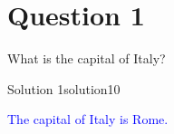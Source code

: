 \documentclass{article}
\begin{document}
\section*{Question 1}
What is the capital of Italy?

\begin{center}
\end{center}

\begin{ocg}{Solution 1}{solution1}{0}
  \begin{center}
    \textcolor{blue}{The capital of Italy is Rome.}
  \end{center}
\end{ocg}
\end{document}
